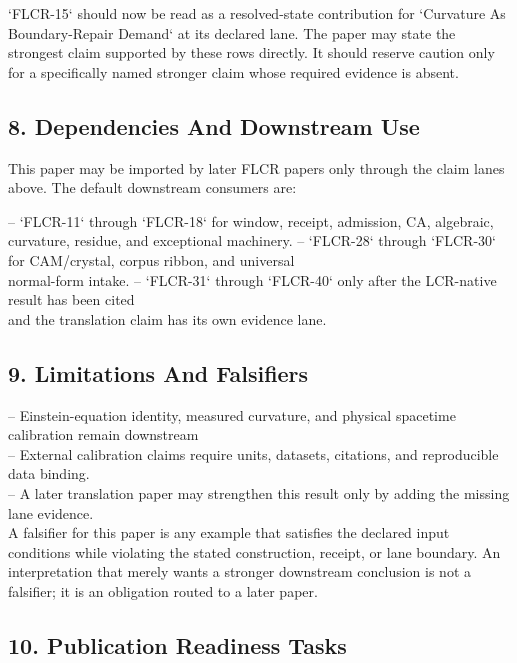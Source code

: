 \documentclass[11pt]{article}
\begin{document}
`FLCR-15` should now be read as a resolved-state contribution for `Curvature As Boundary-Repair Demand` at its declared lane. The paper may state the strongest claim supported by these rows directly. It should reserve caution only for a specifically named stronger claim whose required evidence is absent.

\subsection*{8. Dependencies And Downstream Use}

This paper may be imported by later FLCR papers only through the claim lanes
above. The default downstream consumers are:

\noindent{}-- `FLCR-11` through `FLCR-18` for window, receipt, admission, CA, algebraic,\\
  curvature, residue, and exceptional machinery.
\noindent{}-- `FLCR-28` through `FLCR-30` for CAM/crystal, corpus ribbon, and universal\\
  normal-form intake.
\noindent{}-- `FLCR-31` through `FLCR-40` only after the LCR-native result has been cited\\
  and the translation claim has its own evidence lane.

\subsection*{9. Limitations And Falsifiers}

\noindent{}-- Einstein-equation identity, measured curvature, and physical spacetime calibration remain downstream\\
\noindent{}-- External calibration claims require units, datasets, citations, and reproducible data binding.\\
\noindent{}-- A later translation paper may strengthen this result only by adding the missing lane evidence.\\

A falsifier for this paper is any example that satisfies the declared input
conditions while violating the stated construction, receipt, or lane boundary.
An interpretation that merely wants a stronger downstream conclusion is not a
falsifier; it is an obligation routed to a later paper.

\subsection*{10. Publication Readiness Tasks}
\end{document}
